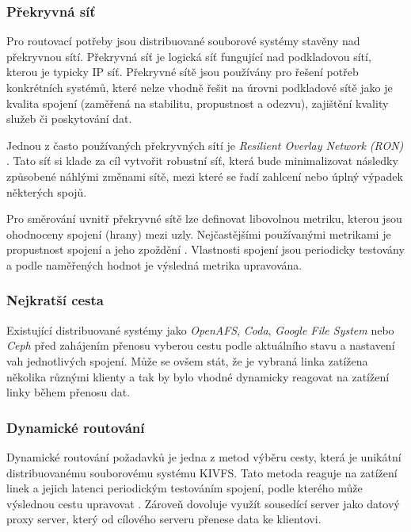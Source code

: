 \documentclass[czech,DP]{thesiskiv}
\begin{document}
\subsubsection*{Překryvná síť}

Pro routovací potřeby jsou distribuované souborové systémy stavěny nad překryvnou sítí. Překryvná síť je logická síť fungující nad podkladovou sítí, kterou je typicky IP síť. Překryvné sítě jsou používány pro řešení potřeb konkrétních systémů, které nelze vhodně řešit na úrovni podkladové sítě jako je kvalita spojení (zaměřená na stabilitu, propustnost a odezvu), zajištění kvality služeb či poskytování dat.

Jednou z často používaných překryvných sítí je \textit{Resilient Overlay Network (RON)} \cite{resilientoverlaypaper}. Tato síť si klade za cíl vytvořit robustní síť, která bude minimalizovat následky způsobené náhlými změnami sítě, mezi které se řadí zahlcení nebo úplný výpadek některých spojů.

Pro směrování uvnitř překryvné sítě lze definovat libovolnou metriku, kterou jsou ohodnoceny spojení (hrany) mezi uzly. Nejčastějšími používanými metrikami je propustnost spojení a jeho zpoždění \cite{skupaoverlaypaper}. Vlastnosti spojení jsou periodicky testovány a podle naměřených hodnot je výsledná metrika upravována.

\subsubsection*{Nejkratší cesta}

Existující distribuované systémy jako \textit{OpenAFS}\cite{openafswiki}, \textit{Coda}\cite{codapaper}, \textit{Google File System}\cite{gfspaper} nebo \textit{Ceph} \cite{cephpaper} před zahájením přenosu vyberou cestu podle aktuálního stavu a nastavení vah jednotlivých spojení. Může se ovšem stát, že je vybraná linka zatížena několika různými klienty a tak by bylo vhodné dynamicky reagovat na zatížení linky během přenosu dat.

\subsubsection*{Dynamické routování}

Dynamické routování požadavků je jedna z metod výběru cesty, která je unikátní distribuovanému souborovému systému KIVFS. Tato metoda reaguje na zatížení linek a jejich latenci periodickým testováním spojení, podle kterého může výslednou cestu upravovat \cite{dynamickacesta}. Zároveň dovoluje využít sousedící server jako datový proxy server, který od cílového serveru přenese data ke klientovi. 
\end{document}
